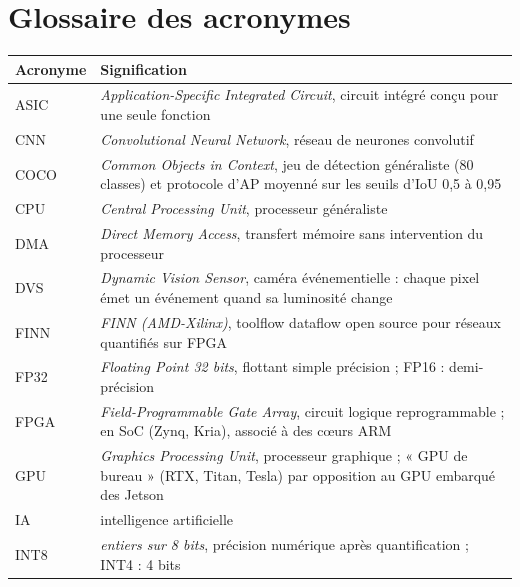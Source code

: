 \section{Glossaire des acronymes}
\label{sec:acronymes}

{\small
\begin{longtable}{@{}>{\raggedright\arraybackslash}p{2.2cm}>{\raggedright\arraybackslash}p{\dimexpr\linewidth-2.2cm-2\tabcolsep\relax}@{}}
\toprule
Acronyme & Signification \\
\midrule
\endhead
\leavevmode\hypertarget{gl:ASIC}{ASIC} & \emph{Application-Specific Integrated Circuit}, circuit intégré conçu pour une seule fonction \\
\leavevmode\hypertarget{gl:CNN}{CNN} & \emph{Convolutional Neural Network}, réseau de neurones convolutif \\
\leavevmode\hypertarget{gl:COCO}{COCO} & \emph{Common Objects in Context}, jeu de détection généraliste (80 classes) et protocole d'AP moyenné sur les seuils d'IoU 0,5 à 0,95 \\
\leavevmode\hypertarget{gl:CPU}{CPU} & \emph{Central Processing Unit}, processeur généraliste \\
\leavevmode\hypertarget{gl:DMA}{DMA} & \emph{Direct Memory Access}, transfert mémoire sans intervention du processeur \\
\leavevmode\hypertarget{gl:DVS}{DVS} & \emph{Dynamic Vision Sensor}, caméra événementielle : chaque pixel émet un événement quand sa luminosité change \\
\leavevmode\hypertarget{gl:FINN}{FINN} & \emph{FINN (AMD-Xilinx)}, toolflow dataflow open source pour réseaux quantifiés sur FPGA \\
\leavevmode\hypertarget{gl:FP32}{FP32} & \emph{Floating Point 32 bits}, flottant simple précision ; FP16 : demi-précision \\
\leavevmode\hypertarget{gl:FPGA}{FPGA} & \emph{Field-Programmable Gate Array}, circuit logique reprogrammable ; en SoC (Zynq, Kria), associé à des cœurs ARM \\
\leavevmode\hypertarget{gl:GPU}{GPU} & \emph{Graphics Processing Unit}, processeur graphique ; « GPU de bureau » (RTX, Titan, Tesla) par opposition au GPU embarqué des Jetson \\
\leavevmode\hypertarget{gl:AI}{IA} & intelligence artificielle \\
\leavevmode\hypertarget{gl:INT8}{INT8} & \emph{entiers sur 8 bits}, précision numérique après quantification ; INT4 : 4 bits \\

\end{longtable}}
